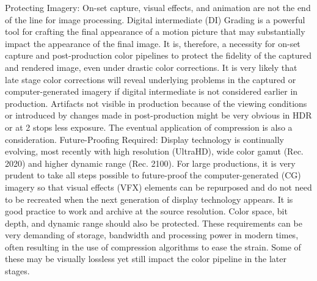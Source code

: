 Protecting Imagery: On-set capture, visual effects, and animation are not the end of the line for image processing. Digital intermediate (DI) Grading is a powerful tool for crafting the final appearance of a motion picture that may substantially impact the appearance of the final image. It is, therefore, a necessity for on-set capture and post-production color pipelines to protect the fidelity of the captured and rendered image, even under drastic color corrections. It is very likely that late stage color corrections will reveal underlying problems in the captured or computer-generated imagery if digital intermediate is not considered earlier in production. Artifacts not visible in production because of the viewing conditions or introduced by changes made in post-production might be very obvious in HDR or at 2 stops less exposure. The eventual application of compression is also a consideration.
Future-Proofing Required: Display technology is continually evolving, most recently with high resolution (UltraHD), wide color gamut (Rec. 2020) and higher dynamic range (Rec. 2100). For large productions, it is very prudent to take all steps possible to future-proof the computer-generated (CG) imagery so that visual effects (VFX) elements can be repurposed and do not need to be recreated when the next generation of display technology appears. It is good practice to work and archive at the source resolution. Color space, bit depth, and dynamic range should also be protected. These requirements can be very demanding of storage, bandwidth and processing power in modern times, often resulting in the use of compression algorithms to ease the strain. Some of these may be visually lossless yet still impact the color pipeline in the later stages.